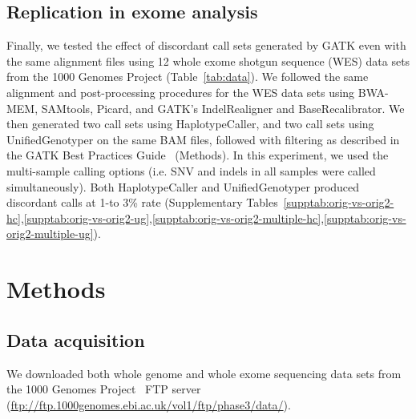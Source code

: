 \documentclass[10pt,a4paper]{article}
\begin{document}
\subsection*{Replication in exome analysis}
Finally, we tested the effect of discordant call sets generated by GATK even with the same alignment files using 12 whole exome shotgun sequence (WES) data sets from the 1000 Genomes Project (Table~\ref{tab:data}). We followed the same alignment and post-processing procedures for the WES data sets using BWA-MEM, SAMtools, Picard, and GATK's IndelRealigner and BaseRecalibrator. We then generated two call sets using HaplotypeCaller, and two call sets using UnifiedGenotyper on the same BAM files, followed with filtering as described in the GATK Best Practices Guide~\cite{VanderAuwera2013} (Methods). In this experiment, we used the multi-sample calling options (i.e. SNV and indels in all samples were called simultaneously). Both HaplotypeCaller and UnifiedGenotyper produced discordant calls at 1-to 3\% rate
(Supplementary Tables~\ref{supptab:orig-vs-orig2-hc},\ref{supptab:orig-vs-orig2-ug},\ref{supptab:orig-vs-orig2-multiple-hc},\ref{supptab:orig-vs-orig2-multiple-ug}). 

\section*{Methods}

\subsection*{Data acquisition}

We downloaded both whole genome and whole exome sequencing data sets from the 1000 Genomes Project~\cite{1000GP2012,1000GP2015} 
FTP server (\url{ftp://ftp.1000genomes.ebi.ac.uk/vol1/ftp/phase3/data/}).
\end{document}
